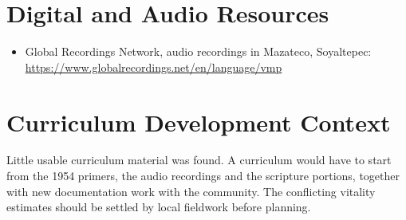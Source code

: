 \documentclass[12pt]{article}
\begin{document}
\section{Digital and Audio Resources}
\begin{itemize}
\item Global Recordings Network, audio recordings in Mazateco, Soyaltepec: \url{https://www.globalrecordings.net/en/language/vmp}
\end{itemize}
\section{Curriculum Development Context}
Little usable curriculum material was found. A curriculum would have to start from the 1954 primers, the audio recordings and the scripture portions, together with new documentation work with the community. The conflicting vitality estimates should be settled by local fieldwork before planning.
\end{document}
